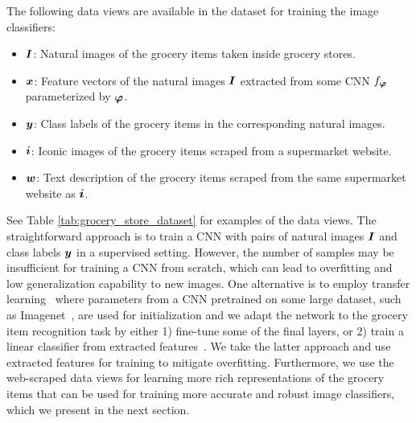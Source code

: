 The following data views are available in the dataset for training the image classifiers:
\begin{itemize}[noitemsep,topsep=1pt]
	\item ${\bm{I}}$: Natural images of the grocery items taken inside grocery stores.
	\item ${\bm{x}}$: Feature vectors of the natural images ${\bm{I}}$ extracted from some CNN $f_{{\bm{\varphi}}}$ parameterized by ${\bm{\varphi}}$. 
	\item ${\bm{y}}$: Class labels of the grocery items in the corresponding natural images.
	\item ${\bm{i}}$: Iconic images of the grocery items scraped from a supermarket website.
	\item ${\bm{w}}$: Text description of the grocery items scraped from the same supermarket website as ${\bm{i}}$.
\end{itemize}
See Table \ref{tab:grocery_store_dataset} for examples of the data views. 
The straightforward approach is to train a CNN with pairs of natural images ${\bm{I}}$ and class labels ${\bm{y}}$ in a supervised setting. However, the number of samples may be insufficient for training a CNN from scratch, which can lead to overfitting and low generalization capability to new images. 
One alternative is to employ transfer learning~\cite{zhuang2020comprehensive} where parameters from a CNN pretrained on some large dataset, such as Imagenet~\cite{deng2009imagenet}, are used for initialization and we adapt the network to the grocery item recognition task by either 1) fine-tune some of the final layers, or 2) train a linear classifier from extracted features~\cite{sharif2014cnn}. We take the latter approach and use extracted features for training to mitigate overfitting. Furthermore, we use the web-scraped data views for learning more rich representations of the grocery items that can be used for training more accurate and robust image classifiers, which we present in the next section.




